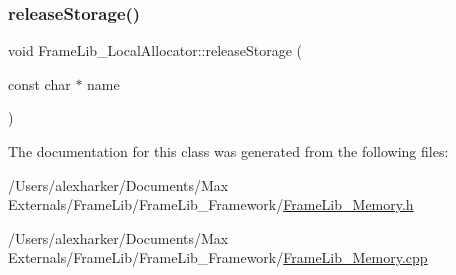 \mbox{\label{class_frame_lib___local_allocator_a5bbca2317e172ec8afa22be33a70d748}} 
\subsubsection{\texorpdfstring{release\+Storage()}{releaseStorage()}}
{\footnotesize\ttfamily void Frame\+Lib\+\_\+\+Local\+Allocator\+::release\+Storage (\begin{DoxyParamCaption}\item[{const char $\ast$}]{name }\end{DoxyParamCaption})}



The documentation for this class was generated from the following files\+:\begin{DoxyCompactItemize}
\item 
/\+Users/alexharker/\+Documents/\+Max Externals/\+Frame\+Lib/\+Frame\+Lib\+\_\+\+Framework/\hyperlink{_frame_lib___memory_8h}{Frame\+Lib\+\_\+\+Memory.\+h}\item 
/\+Users/alexharker/\+Documents/\+Max Externals/\+Frame\+Lib/\+Frame\+Lib\+\_\+\+Framework/\hyperlink{_frame_lib___memory_8cpp}{Frame\+Lib\+\_\+\+Memory.\+cpp}\end{DoxyCompactItemize}
